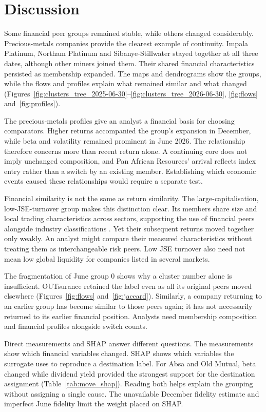 \section{Discussion}

Some financial peer groups remained stable, while others changed considerably. Precious-metals companies provide the clearest example of continuity. Impala Platinum, Northam Platinum and Sibanye-Stillwater stayed together at all three dates, although other miners joined them. Their shared financial characteristics persisted as membership expanded. The maps and dendrograms show the groups, while the flows and profiles explain what remained similar and what changed (Figures~\ref{fig:clusters_tree_2025-06-30}--\ref{fig:clusters_tree_2026-06-30}, \ref{fig:flows} and~\ref{fig:profiles}).

The precious-metals profiles give an analyst a financial basis for choosing comparators. Higher returns accompanied the group's expansion in December, while beta and volatility remained prominent in June 2026. The relationship therefore concerns more than recent return alone. A continuing core does not imply unchanged composition, and Pan African Resources' arrival reflects index entry rather than a switch by an existing member. Establishing which economic events caused these relationships would require a separate test.

Financial similarity is not the same as return similarity. The large-capitalisation, low-JSE-turnover group makes this distinction clear. Its members share size and local trading characteristics across sectors, supporting the use of financial peers alongside industry classifications \citep{lim2021}. Yet their subsequent returns moved together only weakly. An analyst might compare their measured characteristics without treating them as interchangeable risk peers. Low JSE turnover also need not mean low global liquidity for companies listed in several markets.

The fragmentation of June group 0 shows why a cluster number alone is insufficient. OUTsurance retained the label even as all its original peers moved elsewhere (Figures~\ref{fig:flows} and~\ref{fig:jaccard}). Similarly, a company returning to an earlier group has become similar to those peers again; it has not necessarily returned to its earlier financial position. Analysts need membership composition and financial profiles alongside switch counts.

Direct measurements and SHAP answer different questions. The measurements show which financial variables changed. SHAP shows which variables the surrogate uses to reproduce a destination label. For Absa and Old Mutual, beta changed while dividend yield provided the strongest support for the destination assignment (Table~\ref{tab:move_shap}). Reading both helps explain the grouping without assigning a single cause. The unavailable December fidelity estimate and imperfect June fidelity limit the weight placed on SHAP.

